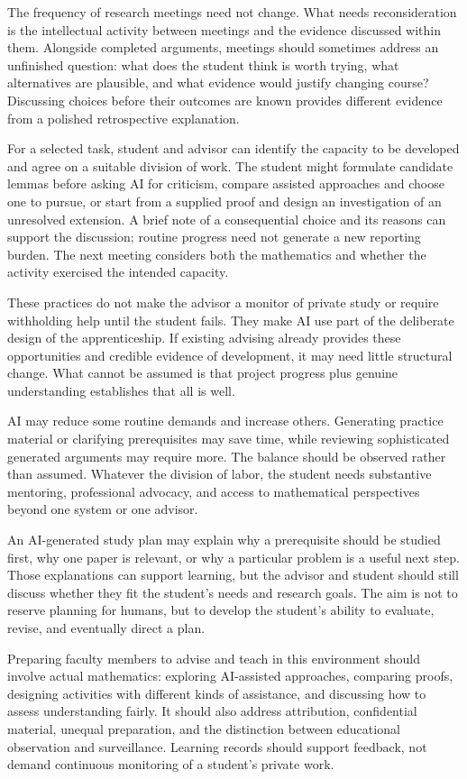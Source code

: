 \documentclass[11pt]{article}
\begin{document}
The frequency of research meetings need not change. What needs reconsideration is the
intellectual activity between meetings and the evidence discussed within them. Alongside
completed arguments, meetings should sometimes address an unfinished question: what
does the student think is worth trying, what alternatives are plausible, and what evidence
would justify changing course? Discussing choices before their outcomes are known
provides different evidence from a polished retrospective explanation.

For a selected task, student and advisor can identify the capacity to be developed and
agree on a suitable division of work. The student might formulate candidate lemmas
before asking AI for criticism, compare assisted approaches and choose one to pursue,
or start from a supplied proof and design an investigation of an unresolved extension.
A brief note of a consequential choice and its reasons can support the discussion;
routine progress need not generate a new reporting burden. The next meeting considers
both the mathematics and whether the activity exercised the intended capacity.

These practices do not make the advisor a monitor of private study or require withholding
help until the student fails. They make AI use part of the deliberate design of the
apprenticeship. If existing advising already provides these opportunities and credible
evidence of development, it may need little structural change. What cannot be assumed
is that project progress plus genuine understanding establishes that all is well.

AI may reduce some routine demands and increase others. Generating practice material
or clarifying prerequisites may save time, while reviewing sophisticated generated
arguments may require more. The balance should be observed rather than assumed.
Whatever the division of labor, the student needs substantive mentoring, professional
advocacy, and access to mathematical perspectives beyond one system or one advisor.

An AI-generated study plan may explain why a prerequisite should be studied first,
why one paper is relevant, or why a particular problem is a useful next step. Those
explanations can support learning, but the advisor and student should still discuss
whether they fit the student's needs and research goals. The aim is not to reserve
planning for humans, but to develop the student's ability to evaluate, revise, and
eventually direct a plan.

Preparing faculty members to advise and teach in this environment should involve actual
mathematics: exploring AI-assisted approaches, comparing proofs, designing activities
with different kinds of assistance, and discussing how to assess understanding fairly. It should also address attribution, confidential material, unequal preparation,
and the distinction between educational observation and surveillance. Learning records
should support feedback, not demand continuous monitoring of a student's private work.
\end{document}
